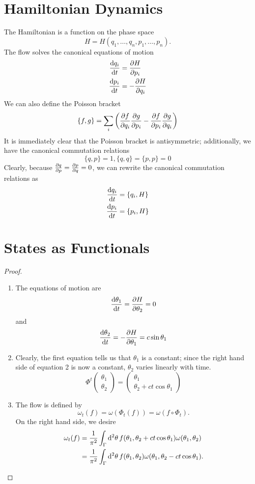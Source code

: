 \begin{revision}
	\section*{Hamiltonian Dynamics}
The Hamiltonian is a function on the phase space
\[H = H(q_1, \dots, q_n, p_1, \dots, p_n).\]
The flow solves the canonical equations of motion
\begin{align*}
\dv{q_i}{t} &= \pdv{H}{p_i}\\
\dv{p_i}{t} &= -\pdv{H}{q_i}
\end{align*}
We can also define the Poisson bracket
\[\{f,g\} = \sum_i \left(\pdv{f}{q_i}\pdv{g}{p_i} - \pdv{f}{p_i}\pdv{g}{q_i}\right)\]
It is immediately clear that the Poisson bracket is antisymmetric; additionally, we have the canonical commutation relations
\[\{q,p\}= 1, \{q,q\}=\{p,p\}=0\]
Clearly, because $\pdv{q}{p} = \pdv{p}{q} = 0$, we can rewrite the canonical commutation relations as
\begin{align*}
	\dv{q_i}{t} &= \{q_i, H\}\\
	\dv{p_i}{t} &= \{p_i, H\}
\end{align*}
\section*{States as Functionals}
\end{revision}
\begin{proof}
	\begin{enumerate}
		\item The equations of motion are
		\[\dv{\theta_1}{t} = \pdv{H}{\theta_2}=0\]
		and 
		\[\dv{\theta_2}{t} = -\pdv{H}{\theta_1}=c\sin\theta_1\]
		\item Clearly, the first equation tells us that $\theta_1$ is a constant; since the right hand side of equation 2 is now a constant, $\theta_2$ varies linearly with time.
		\[\Phi^t \begin{pmatrix}
			\theta_1 \\ \theta_2
		\end{pmatrix} = \begin{pmatrix}
		\theta_1 \\ \theta_2 + ct\cos\theta_1
	\end{pmatrix}\]
\item The flow is defined by
\[\omega_t(f) = \omega(\Phi_t(f))=\omega(f\circ \Phi_t).\]
On the right hand side, we desire
\begin{align*}
\omega_t(f) &= \frac{1}{\pi^2}\int_\Gamma \dd[2]{\theta}f(\theta_1, \theta_2 + ct\cos\theta_1)\omega(\theta_1,\theta_2) \\
&= \frac{1}{\pi^2}\int_\Gamma \dd[2]{\theta}f(\theta_1, \theta_2)\omega(\theta_1,\theta_2-ct\cos\theta_1).\qedhere
\end{align*}
	\end{enumerate}
\end{proof}
